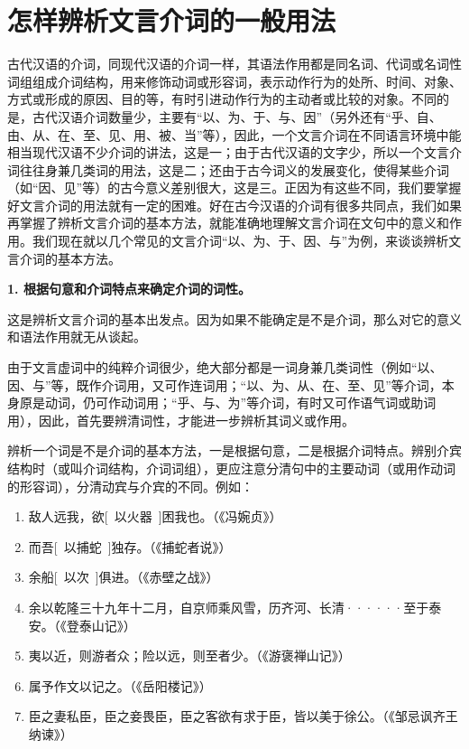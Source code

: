 \section{怎样辨析文言介词的一般用法}

古代汉语的介词，同现代汉语的介词一样，其语法作用都是同名词、代词或名词性词组组成介词结构，用来修饰动词或形容词，表示动作行为的处所、时间、对象、方式或形成的原因、目的等，有时引进动作行为的主动者或比较的对象。不同的是，古代汉语介词数量少，主要有“以、为、于、与、因”（另外还有“乎、自、由、从、在、至、见、用、被、当”等），因此，一个文言介词在不同语言环境中能相当现代汉语不少介词的讲法，这是一；由于古代汉语的文字少，所以一个文言介词往往身兼几类词的用法，这是二；还由于古今词义的发展变化，使得某些介词（如“因、见”等）的古今意义差别很大，这是三。正因为有这些不同，我们要掌握好文言介词的用法就有一定的困难。好在古今汉语的介词有很多共同点，我们如果再掌握了辨析文言介词的基本方法，就能准确地理解文言介词在文句中的意义和作用。我们现在就以几个常见的文言介词“以、为、于、因、与”为例，来谈谈辨析文言介词的基本方法。

\textbf{1. 根据句意和介词特点来确定介词的词性。}

这是辨析文言介词的基本出发点。因为如果不能确定是不是介词，那么对它的意义和语法作用就无从谈起。

由于文言虚词中的纯粹介词很少，绝大部分都是一词身兼几类词性（例如“以、因、与”等，既作介词用，又可作连词用；“以、为、从、在、至、见”等介词，本身原是动词，仍可作动词用；“乎、与、为”等介词，有时又可作语气词或助词用），因此，首先要辨清词性，才能进一步辨析其词义或作用。

辨析一个词是不是介词的基本方法，一是根据句意，二是根据介词特点。辨别介宾结构时（或叫介词结构，介词词组），更应注意分清句中的主要动词（或用作动词的形容词），分清动宾与介宾的不同。例如：

\noindent
[\ 以\ ]
\begin{enumerate}[label=\textcircled{\arabic*}]
	\item 敌人远我，欲[\ 以火器\ ]困我也。（《冯婉贞》）
	\item 而吾[\ 以捕蛇\ ]独存。（《捕蛇者说》）
	\item 余船[\ 以次\ ]俱进。（《赤壁之战》）
	\item 余以乾隆三十九年十二月，自京师乘风雪，历齐河、长清······至于泰安。（《登泰山记》）
	\item 夷以近，则游者众；险以远，则至者少。（《游褒禅山记》）
	\item 属予作文以记之。（《岳阳楼记》）
	\item 臣之妻私臣，臣之妾畏臣，臣之客欲有求于臣，皆以美于徐公。（《邹忌讽齐王纳谏》）
\end{enumerate}

